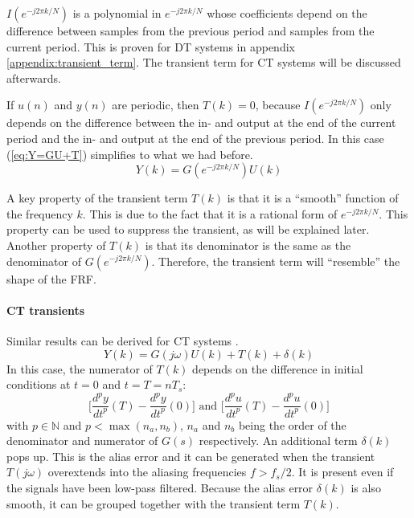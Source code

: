 $I(e^{-j 2 \pi k/N})$ is a polynomial in $e^{-j 2 \pi k/N}$ whose coefficients depend on the difference between samples from the previous period and samples from the current period. This is proven for DT systems in appendix \ref{appendix:transient_term}. The transient term for CT systems will be discussed afterwards.


If $u(n)$ and $y(n)$ are periodic, then $T(k)=0$, because $I(e^{-j 2 \pi k/N})$ only depends on the difference between the in- and output at the end of the current period and the in- and output at the end of the previous period. In this case (\ref{eq:Y=GU+T}) simplifies to what we had before.
\begin{equation*}
    Y(k) = G(e^{-j 2 \pi k/N}) U(k)
\end{equation*}

A key property of the transient term $T(k)$ is that it is a ``smooth'' function of the frequency $k$. This is due to the fact that it is a rational form of $e^{-j2\pi k/N}$. This property can be used to suppress the transient, as will be explained later. Another property of $T(k)$ is that its denominator is the same as the denominator of $G(e^{-j 2 \pi k/N})$. Therefore, the transient term will ``resemble'' the shape of the FRF.

\paragraph{CT transients}
Similar results can be derived for CT systems \cite{pintelon_book}.
\begin{equation*}
\boxed{
    Y(k) = G(j\omega)U(k) + T(k) + \delta(k)
    }
\end{equation*}
In this case, the numerator of $T(k)$ depends on the difference in initial conditions at $t=0$ and $t=T=n T_s$:
\begin{equation*}
    \Big[\frac{d^p y}{{dt}^p}(T) - \frac{d^p y}{{dt}^p}(0)\Big] \text{ and } \Big[\frac{d^p u}{{dt}^p}(T) - \frac{d^p u}{{dt}^p}(0)\Big]
\end{equation*}
with $p \in \mathds{N}$ and $p < \max{(n_a,n_b)}$, $n_a$ and $n_b$ being the order of the denominator and numerator of $G(s)$ respectively. An additional term $\delta(k)$ pops up. This is the alias error and it can be generated when the transient $T(j\omega)$ overextends into the aliasing frequencies  $f > f_s/2$. It is present even if the signals have been low-pass filtered. Because the alias error $\delta(k)$ is also smooth, it can be grouped together with the transient term $T(k)$.


